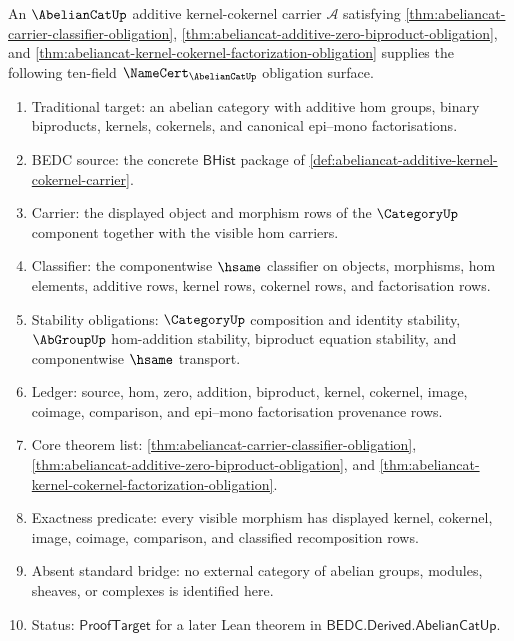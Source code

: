 \begin{theorem}
\label{thm:abeliancat-namecert-obligation-surface}
An $\AbelianCatUp$ additive kernel-cokernel carrier $\mathcal A$ satisfying
\autoref{thm:abeliancat-carrier-classifier-obligation},
\autoref{thm:abeliancat-additive-zero-biproduct-obligation}, and
\autoref{thm:abeliancat-kernel-cokernel-factorization-obligation} supplies the
following ten-field $\NameCert_{\AbelianCatUp}$ obligation surface.
\begin{enumerate}
  \item Traditional target: an abelian category with additive hom groups,
  binary biproducts, kernels, cokernels, and canonical epi--mono
  factorisations.
  \item BEDC source: the concrete $\mathsf{BHist}$ package of
  \autoref{def:abeliancat-additive-kernel-cokernel-carrier}.
  \item Carrier: the displayed object and morphism rows of the
  $\CategoryUp$ component together with the visible hom carriers.
  \item Classifier: the componentwise $\hsame$ classifier on objects,
  morphisms, hom elements, additive rows, kernel rows, cokernel rows, and
  factorisation rows.
  \item Stability obligations: $\CategoryUp$ composition and identity
  stability, $\AbGroupUp$ hom-addition stability, biproduct equation
  stability, and componentwise $\hsame$ transport.
  \item Ledger: source, hom, zero, addition, biproduct, kernel, cokernel,
  image, coimage, comparison, and epi--mono factorisation provenance rows.
  \item Core theorem list:
  \autoref{thm:abeliancat-carrier-classifier-obligation},
  \autoref{thm:abeliancat-additive-zero-biproduct-obligation}, and
  \autoref{thm:abeliancat-kernel-cokernel-factorization-obligation}.
  \item Exactness predicate: every visible morphism has displayed kernel,
  cokernel, image, coimage, comparison, and classified recomposition rows.
  \item Absent standard bridge: no external category of abelian groups,
  modules, sheaves, or complexes is identified here.
  \item Status: $\mathsf{ProofTarget}$ for a later Lean theorem in
  $\mathsf{BEDC.Derived.AbelianCatUp}$.
\end{enumerate}
\end{theorem}
